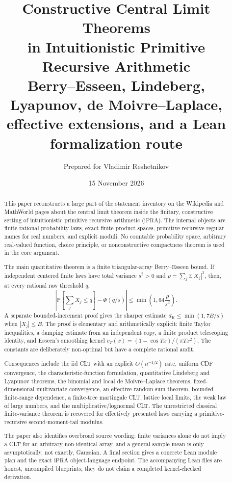 \documentclass[11pt]{article}
\title{\bfseries Constructive Central Limit Theorems\\
       in Intuitionistic Primitive Recursive Arithmetic\\[0.5em]
       \large Berry--Esseen, Lindeberg, Lyapunov, de Moivre--Laplace,\\
       effective extensions, and a Lean formalization route}
\author{Prepared for Vladimir Reshetnikov}
\date{15 November 2026}
\newcommand{\E}{\mathbb E}
\newcommand{\Pp}{\mathbb P}
\newcommand{\PhiN}{\Phi}
\newcommand{\dk}{d_{\mathrm K}}
\newcommand{\abs}[1]{\left|#1\right|}
\newcommand{\ipra}{\mathrm{iPRA}}
\begin{document}
\maketitle

\begin{abstract}
This paper reconstructs a large part of the statement inventory on the
Wikipedia and MathWorld pages about the central limit theorem inside the
finitary, constructive setting of intuitionistic primitive recursive
arithmetic (\(\ipra\)).  The internal objects are finite rational probability
laws, exact finite product spaces, primitive-recursive regular names for real
numbers, and explicit moduli.  No countable probability space, arbitrary
real-valued function, choice principle, or nonconstructive compactness theorem
is used in the core argument.

The main quantitative theorem is a finite triangular-array Berry--Esseen
bound.  If independent centered finite laws have total variance \(s^2>0\) and
\(\rho=\sum_j\E|X_j|^3\), then, at every rational raw threshold \(q\),
\[
 \abs{\Pp\!\left[\sum_j X_j\le q\right]-\PhiN(q/s)}
 \le \min\!\left(1,64\frac{\rho}{s^3}\right).
\]
A separate bounded-increment proof gives the sharper estimate
\(\dk\le\min(1,7B/s)\) when \(|X_j|\le B\).  The proof is elementary and
arithmetically explicit: finite Taylor inequalities, a damping estimate from
an independent copy, a finite product telescoping identity, and Esseen's
smoothing kernel
\(v_T(x)=(1-\cos Tx)/(\pi T x^2)\).  The constants are deliberately
non-optimal but have a complete rational audit.

Consequences include the iid CLT with an explicit \(O(n^{-1/2})\) rate,
uniform CDF convergence, the characteristic-function formulation,
quantitative Lindeberg and Lyapunov theorems, the binomial and local
de Moivre--Laplace theorems, fixed-dimensional multivariate convergence,
an effective random-sum theorem, bounded finite-range dependence, a
finite-tree martingale CLT, lattice local limits, the weak law of large
numbers, and the multiplicative/lognormal CLT.  The unrestricted classical
finite-variance theorem is recovered for effectively presented laws carrying
a primitive-recursive second-moment-tail modulus.

The paper also identifies overbroad source wording: finite variances alone do
not imply a CLT for an arbitrary non-identical array, and a general sample
mean is only asymptotically, not exactly, Gaussian.  A final section gives a
concrete Lean module plan and the exact \(\ipra\) object-language endpoint.
The accompanying Lean files are honest, uncompiled blueprints; they do not
claim a completed kernel-checked derivation.
\end{abstract}
\end{document}
